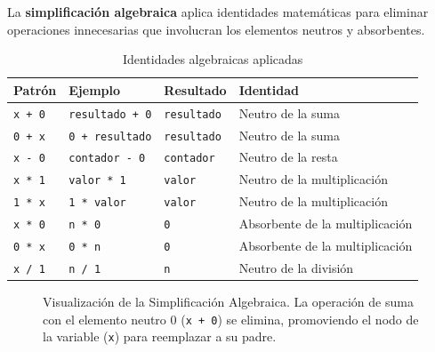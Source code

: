 La \textbf{simplificación algebraica} aplica identidades matemáticas para eliminar operaciones innecesarias que involucran los elementos neutros y absorbentes.

\begin{table}[H]
\centering
\begin{tabular}{llll}
\toprule
\textbf{Patrón} & \textbf{Ejemplo} & \textbf{Resultado} & \textbf{Identidad} \\
\midrule
\texttt{x + 0} & \texttt{resultado + 0} & \texttt{resultado} & Neutro de la suma \\
\texttt{0 + x} & \texttt{0 + resultado} & \texttt{resultado} & Neutro de la suma \\
\texttt{x - 0} & \texttt{contador - 0} & \texttt{contador} & Neutro de la resta \\
\texttt{x * 1} & \texttt{valor * 1} & \texttt{valor} & Neutro de la multiplicación \\
\texttt{1 * x} & \texttt{1 * valor} & \texttt{valor} & Neutro de la multiplicación \\
\texttt{x * 0} & \texttt{n * 0} & \texttt{0} & Absorbente de la multiplicación \\
\texttt{0 * x} & \texttt{0 * n} & \texttt{0} & Absorbente de la multiplicación \\
\texttt{x / 1} & \texttt{n / 1} & \texttt{n} & Neutro de la división \\
\bottomrule
\end{tabular}
\caption{Identidades algebraicas aplicadas}
\label{tab:algebraic}
\end{table}

\begin{figure}[H]
\centering
{}
\caption{Visualización de la Simplificación Algebraica. La operación de suma con el elemento neutro $0$ (\texttt{x + 0}) se elimina, promoviendo el nodo de la variable (\texttt{x}) para reemplazar a su padre.}
\label{fig:opt_algebraic}
\end{figure}

